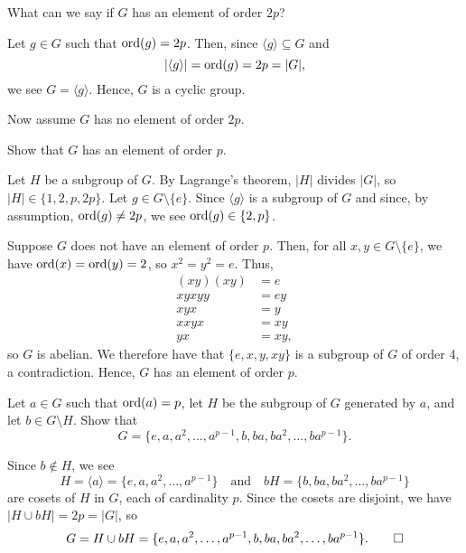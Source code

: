 \begin{exer}
What can we say if $ G $ has an element of order $ 2p $?
\end{exer}
\begin{sltn}
Let $ g\in G $ such that $ \operatorname{ord}(g)=2p $. Then, since $ \langle g\rangle\subseteq G $ and
\begin{equation*}
    \lvert\langle g\rangle\rvert=\operatorname{ord}(g)=2p=\lvert G\rvert,
    \end{equation*}
we see $ G=\langle g\rangle $. Hence, $ G $ is a cyclic group.
\end{sltn}

Now assume $ G $ has no element of order $ 2p $.

\begin{exer}
Show that $ G $ has an element of order $ p $.
\end{exer}
\begin{sltn}
Let $ H $ be a subgroup of $ G $. By Lagrange's theorem, $ \lvert H\rvert $ divides $ \lvert G\rvert $, so $ \lvert H\rvert\in\{1,2,p,2p\} $. Let $ g\in G\setminus\{e\} $. Since $ \langle g\rangle $ is a subgroup of $ G $ and since, by assumption, $ \operatorname{ord}(g)\neq 2p $, we see $ \operatorname{ord}(g)\in\{2,p\} $.

Suppose $ G $ does not have an element of order $ p $. Then, for all $ x,y\in G\setminus\{e\} $, we have $ \operatorname{ord}(x)=\operatorname{ord}(y)=2 $, so $ x^2=y^2=e $. Thus,
\begin{align*}
    (xy)(xy) &= e \\
    xyxyy &= ey \\
    xyx &= y \\
    xxyx &= xy \\
    yx &= xy,
\end{align*}
so $ G $ is abelian. We therefore have that $ \{e,x,y,xy\} $ is a subgroup of $ G $ of order 4, a contradiction. Hence, $ G $ has an element of order $ p $.
\end{sltn}

\begin{exer}
Let $ a\in G $ such that $ \operatorname{ord}(a)=p $, let $ H $ be the subgroup of $ G $ generated by $ a $, and let $ b\in G\setminus H $. Show that
\begin{equation*}
    G=\{e,a,a^2,\ldots,a^{p-1},b,ba,ba^2,\ldots,ba^{p-1}\}.
\end{equation*}
\end{exer}
\begin{sltn}
Since $ b\notin H $, we see
\begin{equation*}
    H=\langle a\rangle=\{e,a,a^2,\ldots,a^{p-1}\} \quad\text{and}\quad bH=\{b,ba,ba^2,\ldots,ba^{p-1}\}
\end{equation*}
are cosets of $ H $ in $ G $, each of cardinality $ p $. Since the cosets are disjoint, we have $ \lvert H\cup bH\rvert=2p=\lvert G\rvert $, so
\begin{equation*}
    G=H\cup bH=\{e,a,a^2,\ldots,a^{p-1},b,ba,ba^2,\ldots,ba^{p-1}\}.\qedhere
\end{equation*}
\end{sltn}


